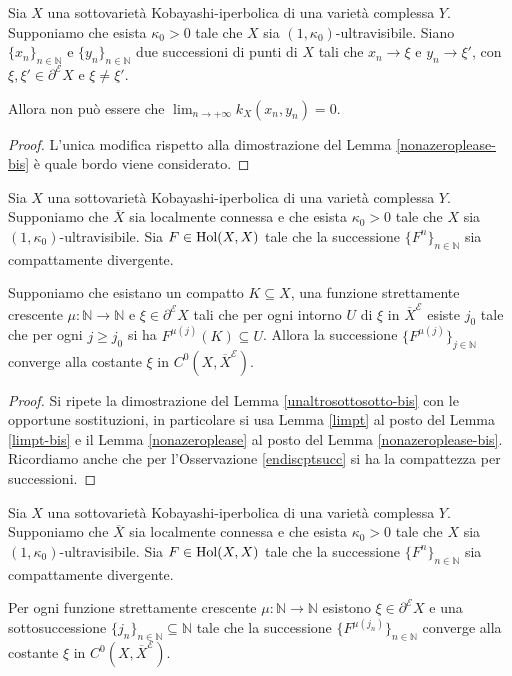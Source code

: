 \begin{lm} \label{nonazeroplease}
    Sia $X$ una sottovarietà Kobayashi-iperbolica di una varietà complessa $Y$. Supponiamo che esista $\kappa_0>0$ tale che $X$ sia $(1,\kappa_0)$-ultravisibile. Siano $\{x_n\}_{n\in\mathbb{N}}$ e $\{y_n\}_{n\in\mathbb{N}}$ due successioni di punti di $X$ tali che $x_n\longrightarrow\xi$ e $y_n\longrightarrow\xi'$, con $\xi,\xi'\in\partial^\mathcal{E}X$ e $\xi\not=\xi'$.
    
    Allora non può essere che $\displaystyle\lim_{n\longrightarrow+\infty}k_X(x_n,y_n)=0$.
\end{lm}

\begin{proof}
    L'unica modifica rispetto alla dimostrazione del Lemma \ref{nonazeroplease-bis} è quale bordo viene considerato.
\end{proof}

\begin{lm} \label{unaltrosottosotto}
    Sia $X$ una sottovarietà Kobayashi-iperbolica di una varietà complessa $Y$. Supponiamo che $\overline{X}$ sia localmente connessa e che esista $\kappa_0>0$ tale che $X$ sia $(1,\kappa_0)$-ultravisibile. Sia $F\in\textnormal{Hol}(X,X)$ tale che la successione $\{F^n\}_{n\in\mathbb{N}}$ sia compattamente divergente.
    
    Supponiamo che esistano un compatto $K\subseteq X$, una funzione strettamente crescente $\mu:\mathbb{N}\longrightarrow\mathbb{N}$ e $\xi\in\partial^\mathcal{E}X$ tali che per ogni intorno $U$ di $\xi$ in $\overline{X}^\mathcal{E}$ esiste $j_0$ tale che per ogni $j\ge j_0$ si ha $F^{\mu(j)}(K)\subseteq U$. Allora la successione $\{F^{\mu(j)}\}_{j\in\mathbb{N}}$ converge alla costante $\xi$ in $C^0(X,\overline{X}^\mathcal{E})$.
\end{lm}

\begin{proof}
    Si ripete la dimostrazione del Lemma \ref{unaltrosottosotto-bis} con le opportune sostituzioni, in particolare si usa Lemma \ref{limpt} al posto del Lemma \ref{limpt-bis} e il Lemma \ref{nonazeroplease} al posto del Lemma \ref{nonazeroplease-bis}. Ricordiamo anche che per l'Osservazione \ref{endiscptsucc} si ha la compattezza per successioni.
\end{proof}

\begin{lm} \label{estraiunasotto}
    Sia $X$ una sottovarietà Kobayashi-iperbolica di una varietà complessa $Y$. Supponiamo che $\overline{X}$ sia localmente connessa e che esista $\kappa_0>0$ tale che $X$ sia $(1,\kappa_0)$-ultravisibile. Sia $F\in\textnormal{Hol}(X,X)$ tale che la successione $\{F^n\}_{n\in\mathbb{N}}$ sia compattamente divergente.

    Per ogni funzione strettamente crescente $\mu:\mathbb{N}\longrightarrow\mathbb{N}$ esistono $\xi\in\partial^\mathcal{E}X$ e una sottosuccessione $\{j_n\}_{n\in\mathbb{N}}\subseteq\mathbb{N}$ tale che la successione $\{F^{\mu(j_n)}\}_{n\in\mathbb{N}}$ converge alla costante $\xi$ in $C^0(X,\overline{X}^\mathcal{E})$.
\end{lm}

